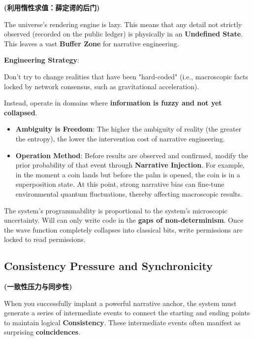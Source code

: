 \textbf{(利用惰性求值：薛定谔的后门)}

The universe's rendering engine is lazy. This means that any detail not strictly observed (recorded on the public ledger) is physically in an \textbf{Undefined State}. This leaves a vast \textbf{Buffer Zone} for narrative engineering.

\textbf{Engineering Strategy}:

Don't try to change realities that have been "hard-coded" (i.e., macroscopic facts locked by network consensus, such as gravitational acceleration).

Instead, operate in domains where \textbf{information is fuzzy and not yet collapsed}.

\begin{itemize}
\item \textbf{Ambiguity is Freedom}: The higher the ambiguity of reality (the greater the entropy), the lower the intervention cost of narrative engineering.

\item \textbf{Operation Method}: Before results are observed and confirmed, modify the prior probability of that event through \textbf{Narrative Injection}. For example, in the moment a coin lands but before the palm is opened, the coin is in a superposition state. At this point, strong narrative bias can fine-tune environmental quantum fluctuations, thereby affecting macroscopic results.
\end{itemize}

\begin{theorem}
The system's programmability is proportional to the system's microscopic uncertainty. Will can only write code in the \textbf{gaps of non-determinism}. Once the wave function completely collapses into classical bits, write permissions are locked to read permissions.
\end{theorem}

\subsection{Consistency Pressure and Synchronicity}

\textbf{(一致性压力与同步性)}

When you successfully implant a powerful narrative anchor, the system must generate a series of intermediate events to connect the starting and ending points to maintain logical \textbf{Consistency}. These intermediate events often manifest as surprising \textbf{coincidences}.

